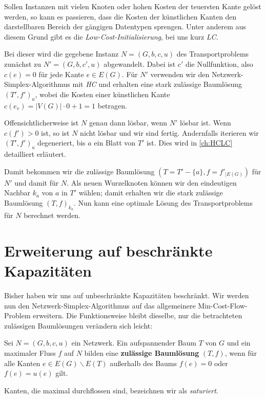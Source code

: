 Sollen Instanzen mit vielen Knoten oder hohen Kosten der teuersten Kante gelöst werden, so kann es passieren, dass die Kosten der künstlichen Kanten den darstellbaren Bereich der gängigen Datentypen sprengen. Unter anderem aus diesem Grund gibt es die \emph{Low-Cost-Initialisierung}, bei uns kurz \emph{LC}.

Bei dieser wird die gegebene Instanz $N=(G,b,c,u)$ des Transportproblems zunächst zu $N'=(G,b,c',u)$ abgewandelt. Dabei ist $c'$ die Nullfunktion, also $c(e)=0$ für jede Kante $e\in E(G)$. Für $N'$ verwenden wir den Netzwerk-Simplex-Algorithmus mit \emph{HC} und erhalten eine stark zulässige Baumlösung $(T',f')_a$, wobei die Kosten einer künstlichen Kante $c(e_v)=|V(G)|\cdot0+1=1$ betragen.

Offensichtlicherweise ist $N$ genau dann lösbar, wenn $N'$ lösbar ist. Wenn $c(f')>0$ ist, so ist $N$ nicht lösbar und wir sind fertig. Andernfalls iterieren wir $(T',f')_a$ degeneriert, bis $a$ ein Blatt von $T'$ ist. Dies wird in \cref{ch:HCLC} detailliert erläutert.

Damit bekommen wir die zulässige Baumlösung $(T=T'-\{a\}, f=f'_{|E(G)})$ für $N'$ und damit für $N$. Als neuen Wurzelknoten können wir den eindeutigen Nachbar $k_a$ von $a$ in $T'$ wählen; damit erhalten wir die stark zulässige Baumlösung $(T,f)_{k_a}$. Nun kann eine optimale Lösung des Transportproblems für $N$ berechnet werden.

\section{Erweiterung auf beschränkte Kapazitäten}\label{ch:alg2}
Bisher haben wir uns auf unbeschränkte Kapazitäten beschränkt. Wir werden nun den Netzwerk-Simplex-Algorithmus auf das allgemeinere Min-Cost-Flow-Problem erweitern. Die Funktionsweise bleibt dieselbe, nur die betrachteten zulässigen Baumlösungen verändern sich leicht:

\begin{defn}Sei $N=(G,b,c,u)$ ein Netzwerk. Ein aufspannender Baum $T$ von $G$ und ein maximaler Fluss $f$ auf $N$ bilden eine \textbf{zulässige Baumlösung} $(T,f)$, wenn für alle Kanten $e\in E(G)\backslash E(T)$ außerhalb des Baums $f(e) = 0$ oder $f(e)=u(e)$ gilt.\end{defn}
\begin{anm}Kanten, die maximal durchflossen sind, bezeichnen wir als \emph{saturiert}.\end{anm}

